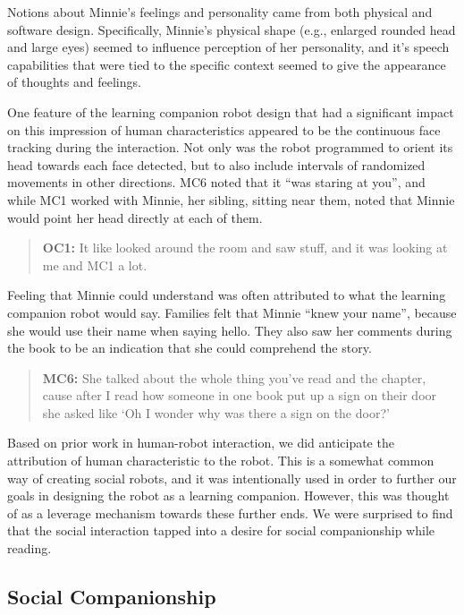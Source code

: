 \documentclass{sigchi}
\begin{document}
Notions about Minnie's feelings and personality came from both physical and software design. Specifically, Minnie's physical shape (e.g., enlarged rounded head and large eyes) seemed to influence perception of her personality, and it's speech capabilities that were tied to the specific context seemed to give the appearance of thoughts and feelings. 

One feature of the learning companion robot design that had a significant impact on this impression of human characteristics appeared to be the continuous face tracking during the interaction. Not only was the robot programmed to orient its head towards each face detected, but to also include intervals of randomized movements in other directions. MC6 noted that it ``was staring at you'', and while MC1 worked with Minnie, her sibling, sitting near them, noted that Minnie would point her head directly at each of them.

	 \begin{quote}
	 	 \textbf{OC1:} It like looked around the room and saw stuff, and it was looking at me and MC1 a lot.
	 \end{quote}
	
Feeling that Minnie could understand was often attributed to what the learning companion robot would say. Families felt that Minnie ``knew your name'', because she would use their name when saying hello. They also saw her comments during the book to be an indication that she could comprehend the story.

	\begin{quote}
		\textbf{MC6:} She talked about the whole thing you've read and the chapter, cause after I read how someone in one book put up a sign on their door she asked like `Oh I wonder why was there a sign on the door?'
	\end{quote} 

Based on prior work in human-robot interaction, we did anticipate the attribution of human characteristic to the robot.  This is a somewhat common way of creating social robots, and it was intentionally used in order to further our goals in designing the robot as a learning companion.  However, this was thought of as a leverage mechanism towards these further ends.  We were surprised to find that the social interaction tapped into a desire for social companionship while reading.

\subsection{Social Companionship}
\end{document}
